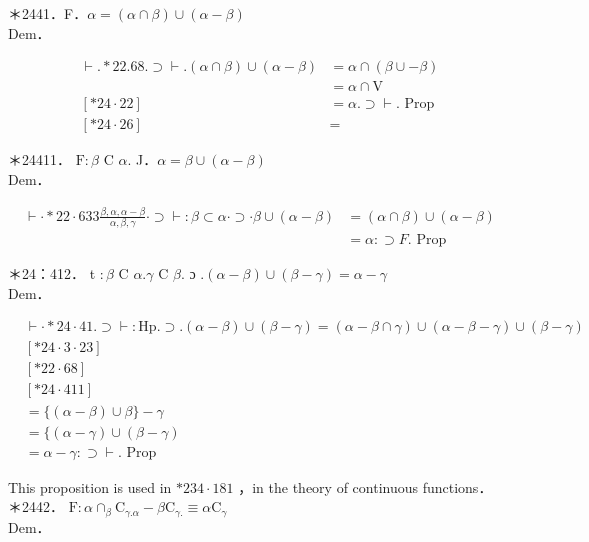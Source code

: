 \documentclass[10pt]{article}
\begin{document}
＊2441．F．$\alpha=(\alpha \cap \beta) \cup(\alpha-\beta)$\\
Dem．

$$
\begin{aligned}
\vdash . * 22.68 . \supset \vdash .(\alpha \cap \beta) \cup(\alpha-\beta) & =\alpha \cap(\beta \cup-\beta) \\
& =\alpha \cap \mathrm{V} \\
{[* 24 \cdot 22] } & =\alpha . \supset \vdash . \text { Prop } \\
{[* 24 \cdot 26] } & =
\end{aligned}
$$

＊24411． $\mathrm{F}: \beta$ C $\alpha$. J．$\alpha=\beta \cup(\alpha-\beta)$\\
Dem．

$$
\begin{aligned}
\vdash \cdot * 22 \cdot 633 \frac{\beta, \alpha, \alpha-\beta}{\alpha, \beta, \gamma} \cdot \supset \vdash: \beta \subset \alpha \cdot \supset \cdot \beta \cup(\alpha-\beta) & =(\alpha \cap \beta) \cup(\alpha-\beta) \\
& =\alpha: \supset F . \text { Prop }
\end{aligned}
$$

＊24：412． t $: \beta$ C $\alpha . \gamma$ C $\beta$. ɔ $.(\alpha-\beta) \cup(\beta-\gamma)=\alpha-\gamma$\\
Dem．

$$
\begin{aligned}
& \vdash \cdot * 24 \cdot 41 . \supset \vdash: \mathrm{Hp} . \supset .(\alpha-\beta) \cup(\beta-\gamma)=(\alpha-\beta \cap \gamma) \cup(\alpha-\beta-\gamma) \cup(\beta-\gamma) \\
& {[* 24 \cdot 3 \cdot 23]} \\
& {[* 22 \cdot 68]} \\
& {[* 24 \cdot 411]} \\
& =\{(\alpha-\beta) \cup \beta\}-\gamma \\
& =\{(\alpha-\gamma) \cup(\beta-\gamma) \\
& =\alpha-\gamma: \supset \vdash . \text { Prop }
\end{aligned}
$$

This proposition is used in $* 234 \cdot 181$ ，in the theory of continuous functions．\\
＊2442． $\mathrm{F}: \alpha \cap_{\beta} \mathrm{C}_{\gamma . \alpha}-\beta \mathrm{C}_{\gamma .} \equiv \alpha \mathrm{C}_{\gamma}$\\
Dem．
\end{document}
